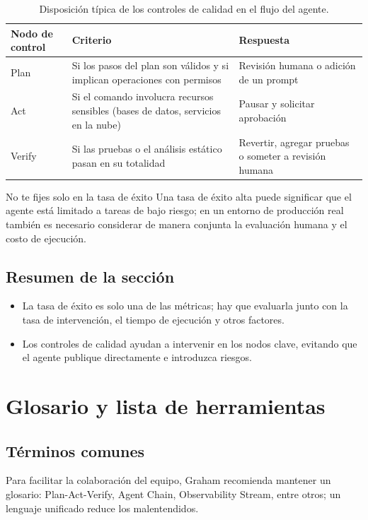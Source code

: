 \documentclass[a4paper]{article}
\begin{document}
\begin{table}[H]
\centering
\begin{tabular}{p{} p{} p{}}
\toprule
Nodo de control & Criterio & Respuesta \\
\midrule
Plan & Si los pasos del plan son válidos y si implican operaciones con permisos & Revisión humana o adición de un prompt \\
\midrule
Act & Si el comando involucra recursos sensibles (bases de datos, servicios en la nube) & Pausar y solicitar aprobación \\
\midrule
Verify & Si las pruebas o el análisis estático pasan en su totalidad & Revertir, agregar pruebas o someter a revisión humana \\
\bottomrule
\end{tabular}
\caption{Disposición típica de los controles de calidad en el flujo del agente.}
\end{table}

\begin{warningbox}{No te fijes solo en la tasa de éxito}
Una tasa de éxito alta puede significar que el agente está limitado a tareas de bajo riesgo; en un entorno de producción real también es necesario considerar de manera conjunta la evaluación humana y el costo de ejecución.
\end{warningbox}

\subsection{Resumen de la sección}
\begin{itemize}
    \item La tasa de éxito es solo una de las métricas; hay que evaluarla junto con la tasa de intervención, el tiempo de ejecución y otros factores.
    \item Los controles de calidad ayudan a intervenir en los nodos clave, evitando que el agente publique directamente e introduzca riesgos.
\end{itemize}
\section{Glosario y lista de herramientas}
\subsection{Términos comunes}
Para facilitar la colaboración del equipo, Graham recomienda mantener un glosario: Plan-Act-Verify, Agent Chain, Observability Stream, entre otros; un lenguaje unificado reduce los malentendidos.
\end{document}
